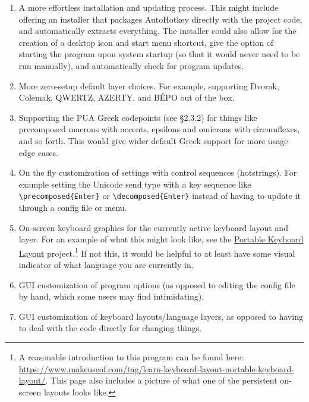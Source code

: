 \documentclass[11pt]{article}
\begin{document}
\begin{enumerate}
\item A more effortless installation and updating process. This might include offering an installer that packages AutoHotkey directly with the project code, and automatically extracts everything. The installer could also allow for the creation of a desktop icon and start menu shortcut, give the option of starting the program upon system startup (so that it would never need to be run manually), and automatically check for program updates.
\item More zero-setup default layer choices. For example, supporting Dvorak, Colemak, QWERTZ, AZERTY, and BÉPO out of the box.
\item Supporting the PUA Greek codepoints (see §2.3.2) for things like precomposed macrons with accents, epsilons and omicrons with circumflexes, and so forth. This would give wider default Greek support for more usage edge cases.
\item On the fly customization of settings with control sequences (hotstrings). For example setting the Unicode send type with a key sequence like \texttt{\textbackslash{}precomposed\{Enter\}} or \texttt{\textbackslash{}decomposed\{Enter\}} instead of having to update it through a config file or menu.
\item On-screen keyboard graphics for the currently active keyboard layout and layer. For an example of what this might look like, see the \href{http://pkl.sourceforge.net/}{Portable Keyboard Layout} project.\footnote{A reasonable introduction to this program can be found here: \url{https://www.makeuseof.com/tag/learn-keyboard-layout-portable-keyboard-layout/}. This page also includes a picture of what one of the persistent on-screen layouts looks like.} If not this, it would be helpful to at least have some visual indicator of what language you are currently in.
\item GUI customization of program options (as opposed to editing the config file by hand, which some users may find intimidating).
\item GUI customization of keyboard layouts/language layers, as opposed to having to deal with the code directly for changing things.

\end{enumerate}
\end{document}
